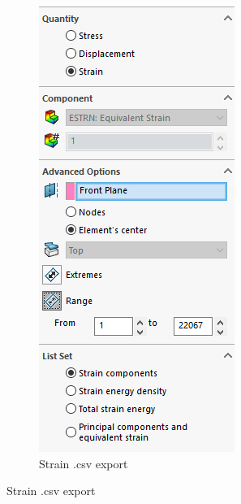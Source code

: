 \documentclass[12pt, letterpaper]{article}
\begin{document}
\begin{figure}[H]
\begin{subfigure}[b]{.3\linewidth}
	\end{subfigure}
	\begin{subfigure}[b]{.3\linewidth}
		\caption{Strain .csv export}
		\includegraphics[width=\linewidth]{./procedure/strain-list}

\end{subfigure}
\end{figure}
\end{document}
